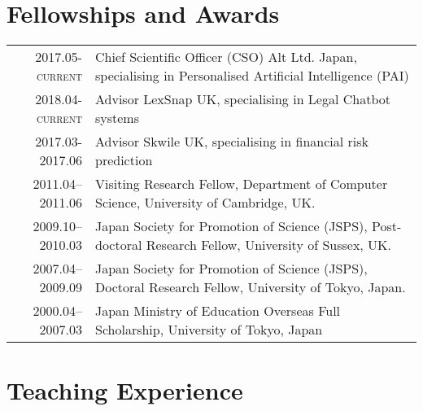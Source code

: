 \documentclass[a4paper,11pt]{article}
\begin{document}
\section{Fellowships and Awards}
\begin{tabular}{r p{11cm}}
\textsc{2017.05-current} & Chief Scientific Officer (CSO) Alt Ltd. Japan, specialising in Personalised Artificial Intelligence (PAI)\\
\textsc{2018.04-current} & Advisor LexSnap UK, specialising in Legal Chatbot systems\\
\textsc{2017.03-2017.06} & Advisor Skwile UK, specialising in financial risk prediction \\
\textsc{2011.04--2011.06} & Visiting Research Fellow, Department of Computer Science, University of Cambridge, UK. \\
\textsc{2009.10--2010.03} & Japan Society for Promotion of Science (JSPS), Post-doctoral Research Fellow, University of Sussex, UK. \\
\textsc{2007.04--2009.09} & Japan Society for Promotion of Science (JSPS), Doctoral Research Fellow, University of Tokyo, Japan.\\
\textsc{2000.04--2007.03} & Japan Ministry of Education Overseas Full Scholarship, University of Tokyo, Japan
\end{tabular}


\section{Teaching Experience}
\end{document}
